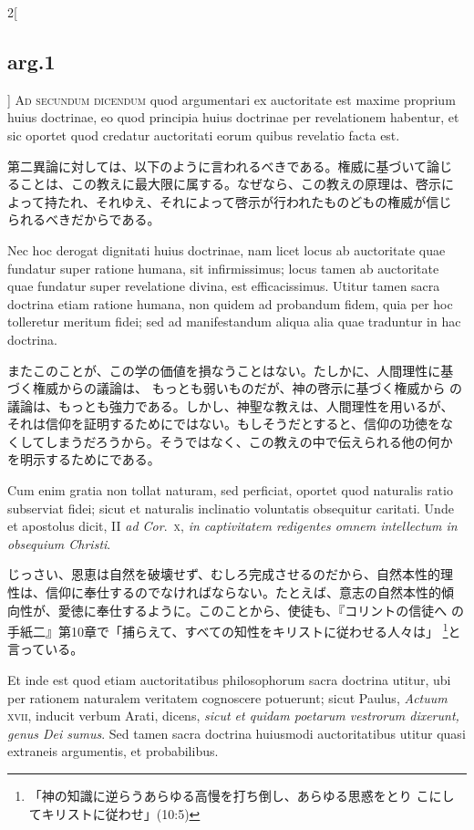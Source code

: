 \documentclass[
paper=a4paper,
fontsize=10pt,
jafontsize=9pt,
titlepage
]{jlreq}
\begin{document}
\begin{paracol}{2}[\subsection{arg.1}]
{\scshape Ad secundum dicendum} quod argumentari ex auctoritate est
maxime proprium huius doctrinae, eo quod principia huius doctrinae per
revelationem habentur, et sic oportet quod credatur auctoritati eorum
quibus revelatio facta est.

\switchcolumn

第二異論に対しては、以下のように言われるべきである。権威に基づいて論じ
ることは、この教えに最大限に属する。なぜなら、この教えの原理は、啓示に
よって持たれ、それゆえ、それによって啓示が行われたものどもの権威が信じ
られるべきだからである。

\switchcolumn*

Nec hoc derogat dignitati huius doctrinae, nam licet locus ab
auctoritate quae fundatur super ratione humana, sit infirmissimus;
locus tamen ab auctoritate quae fundatur super revelatione divina, est
efficacissimus. Utitur tamen sacra doctrina etiam ratione humana, non
quidem ad probandum fidem, quia per hoc tolleretur meritum fidei; sed
ad manifestandum aliqua alia quae traduntur in hac doctrina.

\switchcolumn

またこのことが、この学の価値を損なうことはない。たしかに、人間理性に基
づく権威からの議論は、 もっとも弱いものだが、神の啓示に基づく権威から
の議論は、もっとも強力である。しかし、神聖な教えは、人間理性を用いるが、
それは信仰を証明するためにではない。もしそうだとすると、信仰の功徳をな
くしてしまうだろうから。そうではなく、この教えの中で伝えられる他の何か
を明示するためにである。

\switchcolumn*

Cum enim gratia non tollat naturam, sed perficiat, oportet quod
naturalis ratio subserviat fidei; sicut et naturalis inclinatio
voluntatis obsequitur caritati. Unde et apostolus dicit, II {\itshape
ad Cor}.~{\scshape x}, {\itshape in captivitatem redigentes omnem
intellectum in obsequium Christi}.

\switchcolumn

じっさい、恩恵は自然を破壊せず、むしろ完成させるのだから、自然本性的理
性は、信仰に奉仕するのでなければならない。たとえば、意志の自然本性的傾
向性が、愛徳に奉仕するように。このことから、使徒も、『コリントの信徒へ
の手紙二』第10章で「捕らえて、すべての知性をキリストに従わせる人々は」
\footnote{「神の知識に逆らうあらゆる高慢を打ち倒し、あらゆる思惑をとり
こにしてキリストに従わせ」(10:5)}と言っている。

\switchcolumn*

Et inde est quod etiam auctoritatibus philosophorum sacra doctrina
utitur, ubi per rationem naturalem veritatem cognoscere potuerunt;
sicut Paulus, {\itshape Actuum} {\scshape xvii}, inducit verbum Arati,
dicens, {\itshape sicut et quidam poetarum vestrorum dixerunt, genus
Dei sumus}. Sed tamen sacra doctrina huiusmodi auctoritatibus utitur
quasi extraneis argumentis, et probabilibus.


\end{paracol}
\end{document}
